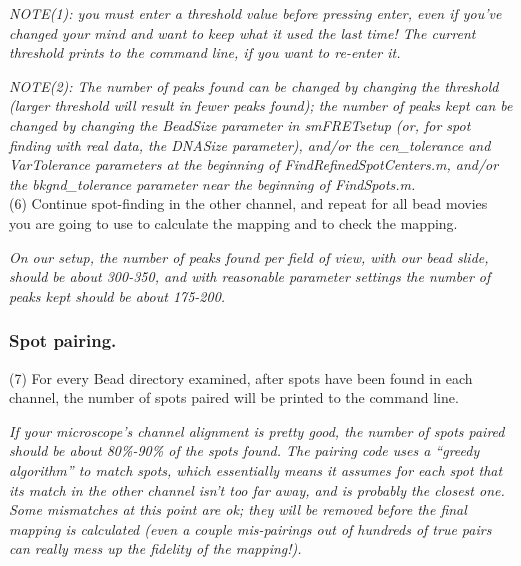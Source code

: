 \documentclass[11pt]{article}
\begin{document}
{\it NOTE(1): you must enter a threshold value before pressing enter, even if you've changed your mind and want to keep what it used the last time!  The current threshold prints to the command line, if you want to re-enter it.}

{\it NOTE(2): The number of peaks found can be changed by changing the threshold (larger threshold will result in fewer peaks found); the number of peaks kept can be changed by changing the BeadSize parameter in smFRETsetup (or, for spot finding with real data, the DNASize parameter), and/or the cen\_tolerance and VarTolerance parameters at the beginning of FindRefinedSpotCenters.m, and/or the bkgnd\_tolerance parameter near the beginning of FindSpots.m.}  \\

\noindent (6) Continue spot-finding in the other channel, and repeat for all bead movies you are going to use to calculate the mapping and to check the mapping. 

{\it On our setup, the number of peaks found per field of view, with our bead slide, should be about 300-350, and with reasonable parameter settings the number of peaks kept should be about 175-200.}

\subsubsection{Spot pairing.}

\noindent (7) For every Bead directory examined, after spots have been found in each channel, the number of spots paired will be printed to the command line. 

{\it If your microscope's channel alignment is pretty good, the number of spots paired should be about 80\%-90\% of the spots found. The pairing code uses a ``greedy algorithm'' to match spots, which essentially means it assumes for each spot that its match in the other channel isn't too far away, and is probably the closest one.  Some mismatches at this point are ok; they will be removed before the final mapping is calculated (even a couple mis-pairings out of hundreds of true pairs can really mess up the fidelity of the mapping!).} \\

 \\
\end{document}
